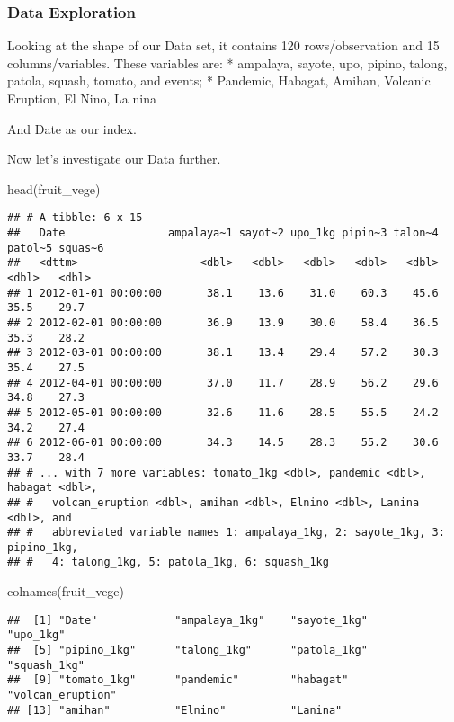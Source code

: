\documentclass[
]{article}
\newenvironment{Shaded}{\begin{snugshade}}{\end{snugshade}}
\newcommand{\FunctionTok}[1]{\textcolor[rgb]{0.00,0.00,0.00}{#1}}
\newcommand{\NormalTok}[1]{#1}
\begin{document}
\hypertarget{data-exploration}{%
\subsubsection{Data Exploration}\label{data-exploration}}

Looking at the shape of our Data set, it contains 120 rows/observation
and 15 columns/variables. These variables are: * ampalaya, sayote, upo,
pipino, talong, patola, squash, tomato, and events; * Pandemic, Habagat,
Amihan, Volcanic Eruption, El Nino, La nina

And Date as our index.

Now let's investigate our Data further.

\begin{Shaded}
\begin{Highlighting}[]
\FunctionTok{head}\NormalTok{(fruit\_vege)}
\end{Highlighting}
\end{Shaded}

\begin{verbatim}
## # A tibble: 6 x 15
##   Date                ampalaya~1 sayot~2 upo_1kg pipin~3 talon~4 patol~5 squas~6
##   <dttm>                   <dbl>   <dbl>   <dbl>   <dbl>   <dbl>   <dbl>   <dbl>
## 1 2012-01-01 00:00:00       38.1    13.6    31.0    60.3    45.6    35.5    29.7
## 2 2012-02-01 00:00:00       36.9    13.9    30.0    58.4    36.5    35.3    28.2
## 3 2012-03-01 00:00:00       38.1    13.4    29.4    57.2    30.3    35.4    27.5
## 4 2012-04-01 00:00:00       37.0    11.7    28.9    56.2    29.6    34.8    27.3
## 5 2012-05-01 00:00:00       32.6    11.6    28.5    55.5    24.2    34.2    27.4
## 6 2012-06-01 00:00:00       34.3    14.5    28.3    55.2    30.6    33.7    28.4
## # ... with 7 more variables: tomato_1kg <dbl>, pandemic <dbl>, habagat <dbl>,
## #   volcan_eruption <dbl>, amihan <dbl>, Elnino <dbl>, Lanina <dbl>, and
## #   abbreviated variable names 1: ampalaya_1kg, 2: sayote_1kg, 3: pipino_1kg,
## #   4: talong_1kg, 5: patola_1kg, 6: squash_1kg
\end{verbatim}

\begin{Shaded}
\begin{Highlighting}[]
\FunctionTok{colnames}\NormalTok{(fruit\_vege)}
\end{Highlighting}
\end{Shaded}

\begin{verbatim}
##  [1] "Date"            "ampalaya_1kg"    "sayote_1kg"      "upo_1kg"        
##  [5] "pipino_1kg"      "talong_1kg"      "patola_1kg"      "squash_1kg"     
##  [9] "tomato_1kg"      "pandemic"        "habagat"         "volcan_eruption"
## [13] "amihan"          "Elnino"          "Lanina"
\end{verbatim}
\end{document}
